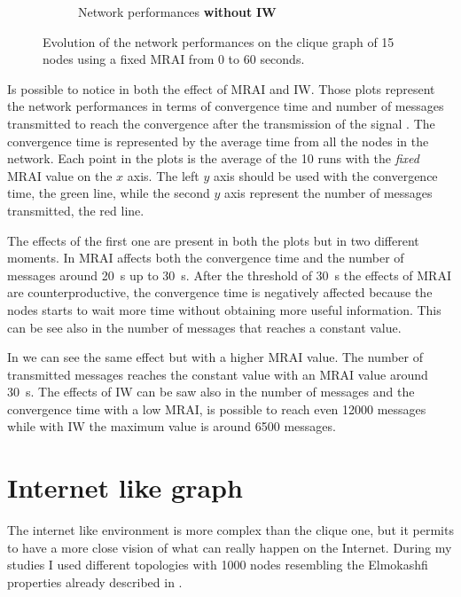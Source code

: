 \begin{figure}[h]
\begin{subfigure}[b]{0.45\textwidth}
		 \caption{Network performances \textbf{without} \textbf{\ac{IW}}}
         \label{fig:clique_evolution_noIW}
     \end{subfigure}
		\caption{Evolution of the network performances on the clique graph of \num{15}
			nodes using a fixed \ac{MRAI} from \num{0} to \num{60} seconds. }
        \label{fig:clique_evolution}
\end{figure}

Is possible to notice in  both the effect of \ac{MRAI}
and \ac{IW}.
Those plots represent the network performances in terms of convergence time and
number of messages transmitted to reach the convergence after the transmission 
of the signal .
The convergence time is represented by the average time from all the nodes in the 
network.
Each point in the plots is the average of the \num{10} runs with the \textit{fixed}
\ac{MRAI} value on the $x$ axis.
The left $y$ axis should be used with the convergence time, the green line, while
the second $y$ axis represent the number of messages transmitted, the red line.

The effects of the first one are present in both the plots but in two different
moments.
In  \ac{MRAI} affects both the convergence time and
the number of messages around \SI{20}{\second} up to \SI{30}{\second}.
After the threshold of \SI{30}{\second} the effects of \ac{MRAI} are counterproductive,
the convergence time is negatively affected because the nodes starts to wait more
time without obtaining more useful information.
This can be see also in the number of messages that reaches a constant value.

In  we can see the same effect but with a higher
\ac{MRAI} value.
The number of transmitted messages reaches the constant value with an \ac{MRAI}
value around \SI{30}{\second}.
The effects of \ac{IW} can be saw also in the number of messages and the convergence
time with a low \ac{MRAI}, is possible to reach even \num{12000} messages while
with \ac{IW} the maximum value is around \num{6500} messages.


\section{Internet like graph}
\label{sec:bgp_mrai_internet_like}

The internet like environment is more complex than the clique one, but it permits
to have a more close vision of what can really happen on the Internet.
During my studies I used different topologies with \num{1000} nodes resembling 
the Elmokashfi properties \cite{elmokashfi2010scalability} already 
described in .

